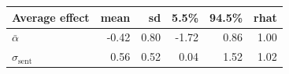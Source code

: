 
\begin{tabular}[t]{lrrrrr}
\toprule
Average effect & mean & sd & 5.5\% & 94.5\% & rhat\\
\midrule
$\bar{\alpha}$ & -0.42 & 0.80 & -1.72 & 0.86 & 1.00\\
$\sigma_{\text{sent}}$ & 0.56 & 0.52 & 0.04 & 1.52 & 1.02\\
\bottomrule
\end{tabular}

